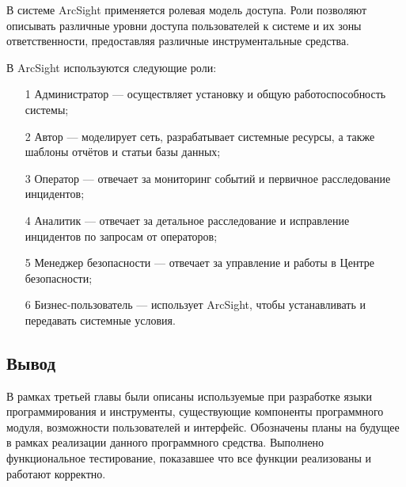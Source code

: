 В системе ArcSight применяется ролевая модель доступа. Роли позволяют описывать различные уровни доступа пользователей к системе и их зоны ответственности, предоставляя различные инструментальные средства.

В ArcSight используются следующие роли:

\begin{itemize}
    \item[1]Администратор --- осуществляет установку и общую работоспособность системы;
    \item[2]Автор --- моделирует сеть, разрабатывает системные ресурсы, а также шаблоны отчётов и статьи базы данных;
    \item[3]Оператор --- отвечает за мониторинг событий и первичное расследование инцидентов;
    \item[4]Аналитик --- отвечает за детальное расследование и исправление инцидентов по запросам от операторов;
    \item[5]Менеджер безопасности --- отвечает за управление и работы в Центре безопасности;
    \item[6]Бизнес-пользователь --- использует ArcSight, чтобы устанавливать и передавать системные условия.
\end{itemize}

\subsection{Вывод}
В рамках третьей главы были описаны используемые при разработке языки программирования и инструменты, существующие компоненты программного модуля, возможности пользователей и интерфейс. Обозначены планы на будущее в рамках реализации данного программного средства. Выполнено функциональное тестирование, показавшее что все функции реализованы и работают корректно.